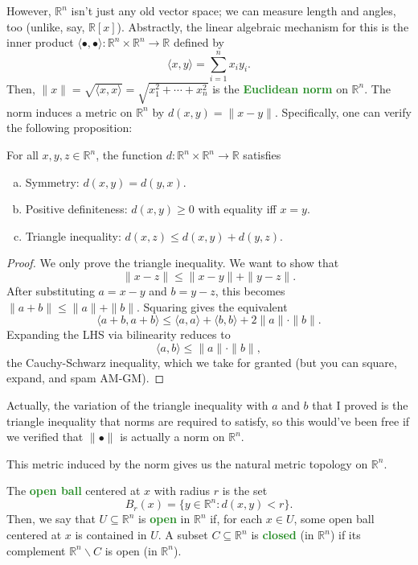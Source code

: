 \documentclass[10pt]{scrartcl}
\providecommand{\RR}{\mathbb R}
\providecommand{\ii}{\item}
\providecommand{\setdiff}{\smallsetminus}
\providecommand{\vocab}[1]{{\textbf{\textcolor{ForestGreen}{#1}}}}
\begin{document}
However, $\RR^n$ isn't just any old vector space;
we can measure length and angles, too (unlike, say, $\RR[x]$).
Abstractly, the linear algebraic mechanism for this is the inner product
$\langle\bullet,\bullet\rangle\colon\RR^n\times\RR^n\to\RR$
defined by
\[\langle x,y\rangle = \sum_{i=1}^n x_iy_i.\]
Then, $\|x\| = \sqrt{\langle x,x\rangle} = \sqrt{x_1^2 + \cdots + x_n^2}$
is the \vocab{Euclidean norm} on $\RR^n$.
The norm induces a metric on $\RR^n$ by $d(x, y) = \|x-y\|$.
Specifically, one can verify the following proposition:
\begin{prop}[$d$ is a metric]
	For all $x,y,z\in\RR^n$, the function
	$d\colon\RR^n\times\RR^n\to\RR$ satisfies
	\begin{enumerate}[(a)]
		\ii Symmetry: $d(x,y) = d(y,x)$.
		\ii Positive definiteness: $d(x,y)\ge 0$ with equality iff $x=y$.
		\ii Triangle inequality: $d(x,z)\le d(x,y)+d(y,z)$.
	\end{enumerate}
\end{prop}

\begin{proof}
	We only prove the triangle inequality. We want to show that
	\[\|x-z\|\le \|x-y\| + \|y-z\|.\]
	After substituting $a = x-y$ and $b = y-z$,
	this becomes $\|a+b\|\le \|a\| + \|b\|$.
	Squaring gives the equivalent
	\[\langle a+b,a+b\rangle \le \langle a,a\rangle + \langle b,b\rangle
	+ 2\|a\|\cdot\|b\|.\]
	Expanding the LHS via bilinearity reduces to
	\[\langle a,b\rangle\le\|a\|\cdot\|b\|,\]
	the Cauchy-Schwarz inequality, which we take for granted
	(but you can square, expand, and spam AM-GM).
\end{proof}

\begin{remark}
	Actually, the variation of the triangle inequality
	with $a$ and $b$ that I proved is the triangle inequality that norms
	are required to satisfy, so this would've been free
	if we verified that $\|\bullet\|$ is actually a norm on $\RR^n$.
\end{remark}

This metric induced by the norm gives us the natural metric topology on $\RR^n$.
\begin{definition}
	The \vocab{open ball} centered at $x$ with radius $r$ is the set
	\[B_r(x) = \{y\in\RR^n : d(x,y) < r\}.\]
	Then, we say that $U\subseteq\RR^n$ is \vocab{open} in $\RR^n$
	if, for each $x\in U$, some open ball centered at $x$
	is contained in $U$.
	A subset $C\subseteq\RR^n$ is \vocab{closed} (in $\RR^n$) if its complement
	$\RR^n\setdiff C$ is open (in $\RR^n$).
\end{definition}
\end{document}
